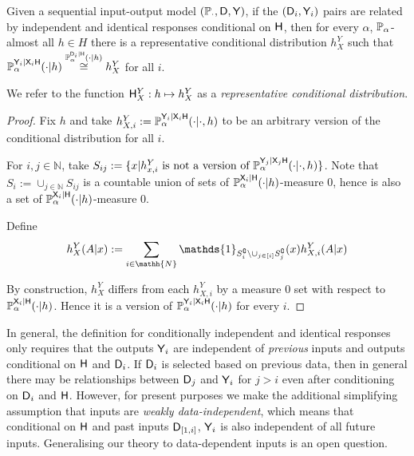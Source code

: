 \begin{theorem}\label{th:repr_cond}
Given a sequential input-output model $(\mathbb{P}_\cdot,\mathsf{D},\mathsf{Y})$, if the $(\mathsf{D}_i,\mathsf{Y}_i)$ pairs are related by independent and identical responses conditional on $\mathsf{H}$, then for every $\alpha$, $\mathbb{P}_\alpha$-almost all $h\in H$ there is a representative conditional distribution $h^Y_X$ such that $\mathbb{P}_\alpha^{\mathsf{Y}_i|\mathsf{X}_i\mathsf{H}}(\cdot|h)\overset{\mathbb{P}_\alpha^{\mathsf{D}_i|\mathsf{H}}(\cdot|h)}{\cong} h^Y_X$ for all $i$.

We refer to the function $\mathsf{H}^Y_X:h\mapsto h^Y_X$ as a \emph{representative conditional distribution}.
\end{theorem}

\begin{proof}
Fix $h$ and take $h^Y_{X,i}:=\mathbb{P}_\alpha^{\mathsf{Y}_i|\mathsf{X}_i\mathsf{H}}(\cdot|\cdot,h)$ to be an arbitrary version of the conditional distribution for all $i$.

For $i,j\in \mathbb{N}$, take $S_{ij} := \{x|h^Y_{x,i}\text{ is not a version of }\mathbb{P}_\alpha^{\mathsf{Y}_j|\mathsf{X}_j\mathsf{H}}(\cdot|\cdot,h)\}$. Note that $S_i:= \cup_{j\in \mathbb{N}} S_{ij}$ is a countable union of sets of $\mathbb{P}_\alpha^{\mathsf{X}_i|\mathsf{H}}(\cdot|h)$-measure 0, hence is also a set of $\mathbb{P}_\alpha^{\mathsf{X}_i|\mathsf{H}}(\cdot|h)$-measure 0.

Define
\begin{align}
    h^Y_X(A|x) := \sum_{i\in \mathh{N}} \mathds{1}_{S_i^\complement\setminus \cup_{j\in[i]}S_j^\complement}(x) h^Y_{X,i}(A|x)
\end{align}

By construction, $h^Y_X$ differs from each $h^Y_{X,i}$ by a measure 0 set with respect to $\mathbb{P}_\alpha^{\mathsf{X}_i|\mathsf{H}}(\cdot|h)$. Hence it is a version of $\mathbb{P}_\alpha^{\mathsf{Y}_i|\mathsf{X}_i\mathsf{H}}(\cdot|h)$ for every $i$.
\end{proof}

In general, the definition for conditionally independent and identical responses only requires that the outputs $\mathsf{Y}_i$ are independent of \emph{previous} inputs and outputs conditional on $\mathsf{H}$ and $\mathsf{D}_i$. If $\mathsf{D}_i$ is selected based on previous data, then in general there may be relationships between $\mathsf{D}_j$ and $\mathsf{Y}_i$ for $j>i$ even after conditioning on $\mathsf{D}_i$ and $\mathsf{H}$. However, for present purposes we make the additional simplifying assumption that inputs are \emph{weakly data-independent}, which means that conditional on $\mathsf{H}$ and past inputs $\mathsf{D}_{[1,i]}$, $\mathsf{Y}_i$ is also independent of all future inputs. Generalising our theory to data-dependent inputs is an open question.

